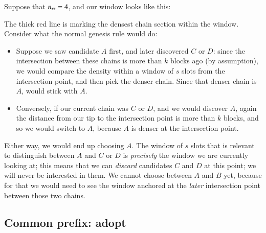 Suppose that $n_\mathit{rs} = 4$, and our window looks like this:
%
\begin{center}
\end{center}
%
The thick red line is marking the densest chain section within the window.
Consider what the normal genesis rule would do:
%
\begin{itemize}
\item
Suppose we saw candidate $A$ first, and later discovered $C$ or $D$: since the
intersection between these chains is more than $k$ blocks ago (by assumption),
we would compare the density within a window of $s$ slots from the intersection
point, and then pick the  denser chain. Since that denser chain is $A$, would
stick with $A$.
\item
Conversely, if our current chain was $C$ or $D$, and we would discover $A$,
again the distance from our tip to the intersection point is more than $k$
blocks, and so we would switch to $A$, because $A$ is denser at the intersection
point.
\end{itemize}
%
Either way, we would end up choosing $A$. The window of $s$ slots that is relevant
to distinguish between $A$ and $C$ or $D$ is \emph{precisely} the window we are
currently looking at; this means that we can \emph{discard} candidates $C$
and $D$ at this point; we will never be interested in them. We cannot choose
between $A$ and $B$ yet, because for that we would need to see the window
anchored at the \emph{later} intersection point between those two chains.

\subsection{Common prefix: adopt}
\label{genesis:adopt}

